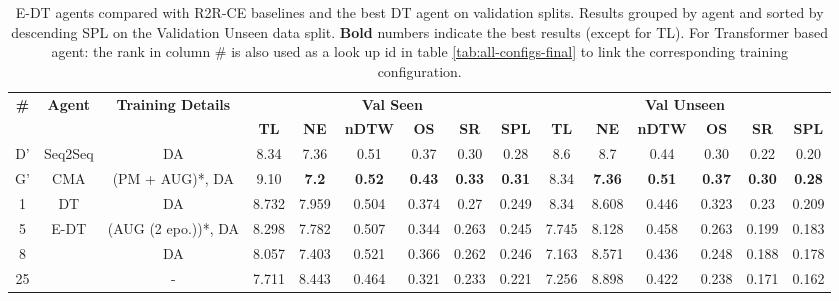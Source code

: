 \begin{table}
\centering
\caption{\label{tab:e_dt_final}E-DT agents compared with R2R-CE baselines and the best DT agent on validation splits. Results grouped by agent and sorted by descending SPL on the Validation Unseen data split. \textbf{Bold} numbers indicate the best results (except for TL). For Transformer based agent: the rank in column \# is also used as a look up id in table \ref{tab:all-configs-final} to link the corresponding training configuration.}
\begin{tabular}{@{\hskip3pt}c@{\hskip3pt}c@{\hskip3pt}c@{\hskip3pt}c@{\hskip3pt}c@{\hskip3pt}c@{\hskip3pt}c@{\hskip3pt}c@{\hskip3pt}c@{\hskip3pt}c@{\hskip3pt}c@{\hskip3pt}c@{\hskip3pt}c@{\hskip3pt}c@{\hskip3pt}c}
\toprule
\textbf{\#} & \textbf{Agent} & \textbf{Training Details} & \multicolumn{6}{c}{\textbf{Val Seen}} & \multicolumn{6}{c}{\textbf{Val Unseen}} \\
 \cmidrule(l){4-9}\cmidrule(l){10-15}\textbf{~} &     \textbf{~} &                \textbf{~} &       \textbf{TL} &     \textbf{NE} &   \textbf{nDTW} &     \textbf{OS} &    \textbf{SR} &    \textbf{SPL} &         \textbf{TL} &     \textbf{NE} &   \textbf{nDTW} &     \textbf{OS} &    \textbf{SR} &    \textbf{SPL} \\
\midrule
          D' & Seq2Seq & DA & 8.34 & 7.36 & 0.51 & 0.37 & 0.30 & 0.28 & 8.6 & 8.7 & 0.44 & 0.30 & 0.22 & 0.20 \\
          \midrule
          G' & CMA & (PM + AUG)*, DA  & 9.10 & \textbf{7.2} & \textbf{0.52} & \textbf{0.43} & \textbf{0.33} & \textbf{0.31} & 8.34 & \textbf{7.36} & \textbf{0.51} & \textbf{0.37} & \textbf{0.30} & \textbf{0.28} \\
          \midrule
          1 &             DT &                  DA &             8.732 &           7.959 &           0.504 &  0.374 &  0.27 &  0.249 &                8.34 &           8.608 &           0.446 &  0.323 &  0.23 &  0.209 \\
          \midrule
          5 &           E-DT &  (AUG (2 epo.))*, DA &             8.298 &           7.782 &           0.507 &           0.344 &          0.263 &           0.245 &               7.745 &  8.128 &  0.458 &           0.263 &          0.199 &           0.183 \\
          8 &            &                   DA &             8.057 &  7.403 &  0.521 &           0.366 &          0.262 &           0.246 &               7.163 &           8.571 &           0.436 &           0.248 &          0.188 &           0.178 \\
         25 &            &                     - &             7.711 &           8.443 &           0.464 &           0.321 &          0.233 &           0.221 &               7.256 &           8.898 &           0.422 &           0.238 &          0.171 &           0.162 \\
\bottomrule
\end{tabular}
\end{table}
